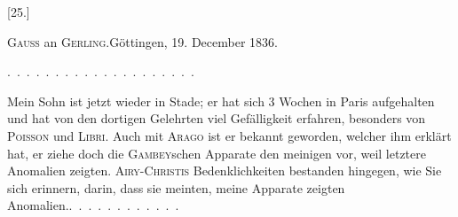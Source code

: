 \bigskip{}
\begin{center}[25.]\end{center}
\begin{center}\textsc{Gauss} an \textsc{Gerling}.\quad Göttingen, 19. December 1836.\end{center}
\noindent .\ .\ .\ .\ .\ .\ .\ .\ .\ .\ .\ .\ .\ .\ .\ .\ .\ .\ .\ .\par
\indent Mein Sohn ist jetzt wieder in Stade; er hat sich 3 Wochen in Paris
aufgehalten und hat von den dortigen Gelehrten viel Gefälligkeit erfahren,
besonders von \textsc{Poisson} und \textsc{Libri}. Auch mit \textsc{Arago} ist er bekannt geworden,
welcher ihm erklärt hat, er ziehe doch die \textsc{Gambey}schen Apparate den
meinigen vor, weil letztere  Anomalien zeigten. \textsc{Airy-Christis} Bedenklichkeiten
bestanden hingegen, wie Sie sich erinnern, darin, dass sie
meinten, meine Apparate zeigten  Anomalien.\quad .\ .\ .\ .\ .\ .\ .\ .\ .\ .\ .\ .
\clearpage\endgroup
